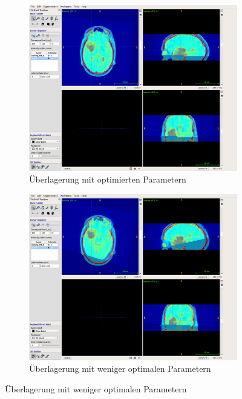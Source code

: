 \begin{figure}[ht]
  \caption{Qualitätsunterschiede bei verschiedenen Registrierungsstrategien}
  \label{pic:A3}
  \begin{subfigure}{\linewidth}
    \centering
    \includegraphics[height=0.44\textheight]{images/A3_good.png}
    \caption{Überlagerung mit optimierten Parametern}
  \end{subfigure}
  \vfill
  \begin{subfigure}{\linewidth}
    \centering
    \includegraphics[height=0.44\textheight]{images/A3_bad.png}
    \caption{Überlagerung mit weniger optimalen Parametern}
  \end{subfigure}
\end{figure}
